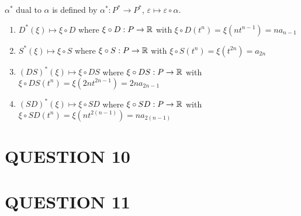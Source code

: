 \documentclass[a4paper]{article}
\begin{document}
$ \alpha^{*} $ dual to $ \alpha $ is defined by $ \alpha^{*} : P^{*} \to P^{*} $, $ \varepsilon \mapsto  \varepsilon \circ \alpha $.

\begin{enumerate}[label = (\alph*)]
	\item $ D^{*} (\xi) \mapsto \xi \circ D $ where $ \xi \circ D : P \to \mathbb{R} $ with $ \xi \circ D (t^{n}) = \xi(n t^{n-1})  = n a_{n-1}$ 
	
	\item $ S^{*}(\xi) \mapsto \xi \circ S $ where $ \xi \circ S : P \to \mathbb{R} $ with $ \xi \circ S(t^{n}) = \xi(t^{2n}) = a_{2n} $
	
	\item $ (DS)^{*} (\xi) \mapsto \xi \circ D S $ where $ \xi \circ DS : P \to \mathbb{R} $ with $ \xi \circ DS (t^{n}) = \xi(2n t^{2n-1})  = 2n a_{2n-1}$ 
		
	\item $ (SD)^{*} (\xi) \mapsto \xi \circ SD $ where $ \xi \circ SD : P \to \mathbb{R} $ with $ \xi \circ SD (t^{n}) = \xi(n t^{2(n-1)})  = n a_{2(n-1)}$ 
\end{enumerate}

\section{QUESTION 10}
\section{QUESTION 11}

	
	
	
\end{document}
